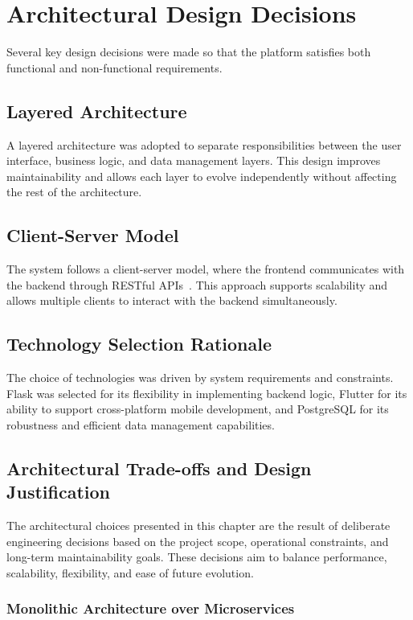 \section{Architectural Design Decisions}

Several key design decisions were made so that the platform satisfies both functional and non-functional requirements.

\subsection{Layered Architecture}

A layered architecture was adopted to separate responsibilities between the user interface, business logic, and data management layers. This design improves maintainability and allows each layer to evolve independently without affecting the rest of the architecture.

\subsection{Client-Server Model}

The system follows a client-server model, where the frontend communicates with the backend through RESTful APIs~\cite{rest}. This approach supports scalability and allows multiple clients to interact with the backend simultaneously.

\subsection{Technology Selection Rationale}

The choice of technologies was driven by system requirements and constraints. Flask was selected for its flexibility in implementing backend logic, Flutter for its ability to support cross-platform mobile development, and PostgreSQL for its robustness and efficient data management capabilities.

\subsection{Architectural Trade-offs and Design Justification}

The architectural choices presented in this chapter are the result of deliberate engineering decisions based on the project scope, operational constraints, and long-term maintainability goals. These decisions aim to balance performance, scalability, flexibility, and ease of future evolution.
\subsubsection{Monolithic Architecture over Microservices}

